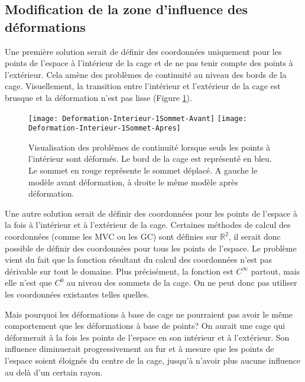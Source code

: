 \subsection{Modification de la zone d'influence des déformations}

Une première solution serait de définir des coordonnées uniquement pour les
points de l'espace à l'intérieur de la cage et de ne pas tenir compte des
points à l'extérieur. Cela amène des problèmes de continuité au niveau des
bords de la cage. Visuellement, la transition entre l'intérieur et l'extérieur
de la cage est brusque et la déformation n'est pas lisse (Figure \ref{MELVI}).

\begin{figure}[ht]
  \begin{center}
    \scalebox{0.2}
    {
      \texttt{[image: Deformation-Interieur-1Sommet-Avant]}
      \texttt{[image: Deformation-Interieur-1Sommet-Apres]}
    }

    \caption[Problème de continuité déformation naïve] {Visualisation des
problèmes de continuité lorsque seuls les points à l'intérieur sont déformés.
Le bord de la cage est représenté en bleu. Le sommet en rouge représente le
sommet déplacé. A gauche le modèle avant déformation, à droite le même modèle
après déformation.}

    \label{MELVI}
  \end{center}
\end{figure}

Une autre solution serait de définir des coordonnées pour les points de
l'espace à la fois à l'intérieur et à l'extérieur de la cage. Certaines
méthodes de calcul des coordonnées (comme les MVC ou les GC) sont définies sur
$\mathbb{R}^2$, il serait donc possible de définir des coordonnées pour tous
les points de l'espace. Le problème vient du fait que la fonction résultant du
calcul des coordonnées n'est pas dérivable sur tout le domaine. Plus
précisément, la fonction est $C^{\infty}$ partout, mais elle n'est que $C^0$
au niveau des sommets de la cage. On ne peut donc pas utiliser les coordonnées
existantes telles quelles.

Mais pourquoi les déformations à base de cage ne pourraient pas avoir le même
comportement que les déformations à base de points? On aurait une cage qui
déformerait à la fois les points de l'espace en son intérieur et à
l'extérieur.  Son influence diminuerait progressivement au fur et à mesure que
les points de l'espace soient éloignés du centre de la cage, jusqu'à n'avoir
plus aucune influence au delà d'un certain rayon.

